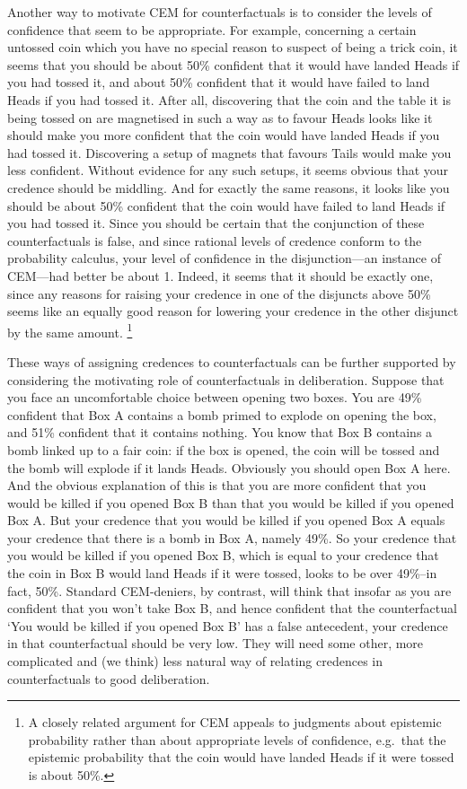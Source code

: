 \documentclass[leqno, 11pt, a5paper, openany]{article}
\begin{document}
Another way to motivate CEM for counterfactuals is to consider the levels of confidence that seem to be appropriate. For example, concerning a certain untossed coin which you have no special reason to suspect of being a trick coin, it seems that you should be about 50\% confident that it would have landed Heads if you had tossed it, and about 50\% confident that it would have failed to land Heads if you had tossed it. After all, discovering that the coin and the table it is being tossed on are magnetised in such a way as to favour Heads looks like it should make you more confident that the coin would have landed Heads if you had tossed it. Discovering a setup of magnets that favours Tails would make you less confident. Without evidence for any such setups, it seems obvious that your credence should be middling. And for exactly the same reasons, it looks like you should be about 50\% confident that the coin would have failed to land Heads if you had tossed it. Since you should be certain that the conjunction of these counterfactuals is false, and since rational levels of credence conform to the probability calculus, your level of confidence in the disjunction---an instance of CEM---had better be about 1.  Indeed, it seems that it should be exactly one, since any reasons for raising your credence in one of the disjuncts above 50\% seems like an equally good reason for lowering your credence in the other disjunct by the same amount.%
\footnote{A closely related argument for CEM appeals to judgments about epistemic probability rather than about appropriate levels of confidence, e.g.~that the epistemic probability that the coin would have landed Heads if it were tossed is about 50\%.}

These ways of assigning credences to counterfactuals can be further supported by considering the motivating role of counterfactuals in deliberation. Suppose that you face an uncomfortable choice between opening two boxes. You are 49\% confident that Box A contains a bomb primed to explode on opening the box, and 51\% confident that it contains nothing. You know that Box B contains a bomb linked up to a fair coin: if the box is opened, the coin will be tossed and the bomb will explode if it lands Heads. Obviously you should open Box A here. And the obvious explanation of this is that you are more confident that you would be killed if you opened Box B than that you would be killed if you opened Box A. But your credence that you would be killed if you opened Box A equals your credence that there is a bomb in Box A, namely 49\%. So your credence that you would be killed if you opened Box B, which is equal to your credence that the coin in Box B would land Heads if it were tossed, looks to be over 49\%--in fact, 50\%. Standard CEM-deniers, by contrast, will think that insofar as you are confident that you won't take Box B, and hence confident that the counterfactual ‘You would be killed if you opened Box B’ has a false antecedent, your credence in that counterfactual should be very low. They will need some other, more complicated and (we think) less natural way of relating credences in counterfactuals to good deliberation.
\end{document}
